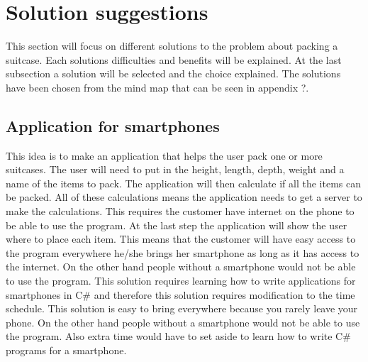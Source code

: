 \section{Solution suggestions} 	
This section will focus on different solutions to the problem about packing a suitcase. Each solutions difficulties and benefits will be explained. At the last subsection a solution will be selected and the choice explained. The solutions have been chosen from the mind map that can be seen in appendix ?.
\newline
\subsection{Application for smartphones}
This idea is to make an application that helps the user pack one or more suitcases. The user will need to put in the height, length, depth, weight and a name of the items to pack. The application will then calculate if all the items can be packed. All of these calculations means the application needs to get a server to make the calculations. This requires the customer have internet on the phone to be able to use the program. At the last step the application will show the user where to place each item. This means that the customer will have easy access to the program everywhere he/she brings her smartphone as long as it has access to the internet. On the other hand people without a smartphone would not be able to use the program. This solution requires learning how to write applications for smartphones in C# and therefore this solution requires modification to the time schedule. This solution is easy to bring everywhere because you rarely leave your phone. On the other hand people without a smartphone would not be able to use the program. Also extra time would have to set aside to learn how to write C# programs for a smartphone.
\newline

